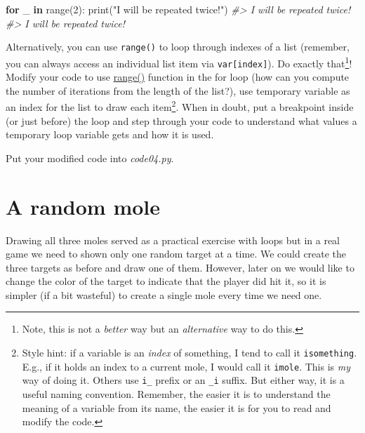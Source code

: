 \documentclass[
]{book}
\newenvironment{Shaded}{\begin{snugshade}}{\end{snugshade}}
\newcommand{\BuiltInTok}[1]{#1}
\newcommand{\CommentTok}[1]{\textcolor[rgb]{0.56,0.35,0.01}{\textit{#1}}}
\newcommand{\ControlFlowTok}[1]{\textcolor[rgb]{0.13,0.29,0.53}{\textbf{#1}}}
\newcommand{\DecValTok}[1]{\textcolor[rgb]{0.00,0.00,0.81}{#1}}
\newcommand{\KeywordTok}[1]{\textcolor[rgb]{0.13,0.29,0.53}{\textbf{#1}}}
\newcommand{\NormalTok}[1]{#1}
\newcommand{\StringTok}[1]{\textcolor[rgb]{0.31,0.60,0.02}{#1}}
\begin{document}
\begin{Shaded}
\begin{Highlighting}[]
\ControlFlowTok{for}\NormalTok{ \_ }\KeywordTok{in} \BuiltInTok{range}\NormalTok{(}\DecValTok{2}\NormalTok{):}
    \BuiltInTok{print}\NormalTok{(}\StringTok{"I will be repeated twice!"}\NormalTok{)}
\CommentTok{\#\textgreater{} I will be repeated twice!}
\CommentTok{\#\textgreater{} I will be repeated twice!}
\end{Highlighting}
\end{Shaded}

Alternatively, you can use \texttt{range()} to loop through indexes of a list (remember, you can always access an individual list item via \texttt{var{[}index{]}}). Do exactly that\footnote{Note, this is not a \emph{better} way but an \emph{alternative} way to do this.}! Modify your code to use \href{(https://docs.python.org/3/library/stdtypes.html\#range)}{range()} function in the for loop (how can you compute the number of iterations from the length of the list?), use temporary variable as an index for the list to draw each item\footnote{Style hint: if a variable is an \emph{index} of something, I tend to call it \texttt{isomething}. E.g., if it holds an index to a current mole, I would call it \texttt{imole}. This is \emph{my} way of doing it. Others use \texttt{i\_} prefix or an \texttt{\_i} suffix. But either way, it is a useful naming convention. Remember, the easier it is to understand the meaning of a variable from its name, the easier it is for you to read and modify the code.}. When in doubt, put a breakpoint inside (or just before) the loop and step through your code to understand what values a temporary loop variable gets and how it is used.

Put your modified code into \emph{code04.py}.

\hypertarget{random-mole}{%
\section{A random mole}\label{random-mole}}

Drawing all three moles served as a practical exercise with loops but in a real game we need to shown only one random target at a time. We could create the three targets as before and draw one of them. However, later on we would like to change the color of the target to indicate that the player did hit it, so it is simpler (if a bit wasteful) to create a single mole every time we need one.
\end{document}
